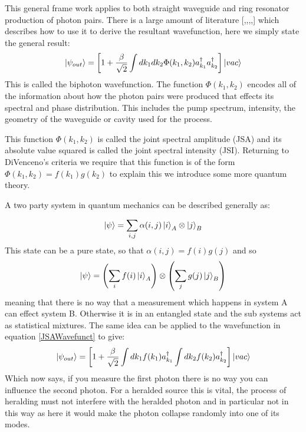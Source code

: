 This general frame work applies to both straight waveguide and ring resonator production of photon pairs. There is a large amount of literature [,,,,] which describes how to use it to derive the resultant wavefunction, here we simply state the general result:
\begin{equation}
\ket{\psi_{out}}=\left [1 + \frac{\beta}{\sqrt{2}}\int dk_1dk_2\Phi(k_1,k_2)a_{k_1}^{\dagger}a_{k_2}^{\dagger} \right ]\ket{vac} \label{JSAWavefunct}
\end{equation}
This is called the biphoton wavefunction. The function $\Phi(k_1,k_2)$ encodes all of the information about how the photon pairs were produced that effects its spectral and phase distribution. This includes the pump spectrum, intensity, the geometry of the waveguide or cavity used for the process.

This function $\Phi(k_1,k_2)$ is called the joint spectral amplitude (JSA) and its absolute value squared is called the joint spectral intensity (JSI). Returning to DiVenceno's criteria we require that this function is of the form $\Phi(k_1,k_2)=f(k_1)g(k_2)$ to explain this we introduce some more quantum theory.

A two party system in quantum mechanics can be described generally as:

\begin{equation}
\ket{\psi} = \sum_{i,j}\alpha(i,j)\ket{i}_A\otimes\ket{j}_B 
\end{equation}
\noindent
This state can be a pure state, so that $\alpha(i,j)=f(i)g(j)$ and so
\begin{equation}
\ket{\psi} = \left (\sum_{i}f(i)\ket{i}_A \right ) \otimes \left (\sum_{j}g(j)\ket{j}_B \right )
\end{equation}
meaning that there is no way that a measurement which happens in system A can effect system B. Otherwise it is in an entangled state and the sub systems act as statistical mixtures. The same idea can be applied to the wavefunction in equation \ref{JSAWavefunct} to give:
\begin{equation}
\ket{\psi_{out}}=\left [1 + \frac{\beta}{\sqrt{2}}\int dk_1f(k_1)a_{k_1}^{\dagger} \int dk_2f(k_2)a_{k_2}^{\dagger} \right ]\ket{vac}
\end{equation}
Which now says, if you measure the first photon there is no way you can influence the second photon. For a heralded source this is vital, the process of heralding must not interfere with the heralded photon and in particular not in this way as here it would make the photon collapse randomly into one of its modes.





